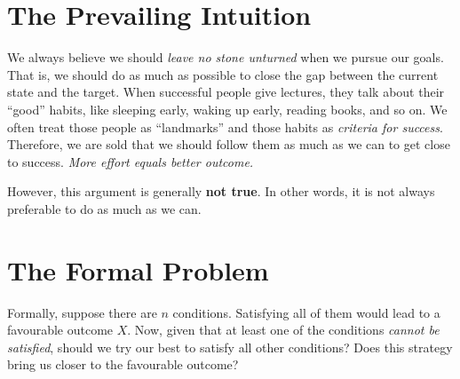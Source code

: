 \documentclass[11pt]{article}
\begin{document}
\begin{abstract}
\noindent
If satisfying all conditions for an optimal outcome is good, then satisfying as many as possible must be second best. This reasoning is false. When a constraint prevents one condition from being met, the remaining conditions are no longer individually desirable. Satisfying them can worsen the outcome. Drawing on the theory of the second best, we show that constrained optima require violating the unconstrained conditions. Doing more of a good thing can push you further from the optimum.
\end{abstract}

\section{The Prevailing Intuition}

We always believe we should \textit{leave no stone unturned} when we pursue our goals. That is, we should do as much as possible to close the gap between the current state and the target. When successful people give lectures, they talk about their ``good'' habits, like sleeping early, waking up early, reading books, and so on. We often treat those people as ``landmarks'' and those habits as \textit{criteria for success}. Therefore, we are sold that we should follow them as much as we can to get close to success. \textit{More effort equals better outcome.}

However, this argument is generally \textbf{not true}. In other words, it is not always preferable to do as much as we can.

\section{The Formal Problem}

Formally, suppose there are \(n\) conditions. Satisfying all of them would lead to a favourable outcome \(X\). Now, given that at least one of the conditions \textit{cannot be satisfied}, should we try our best to satisfy all other conditions? Does this strategy bring us closer to the favourable outcome?
\end{document}
